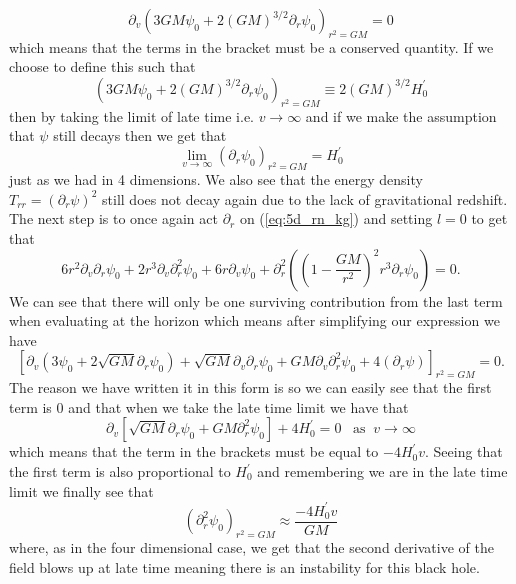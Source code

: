 \documentclass[12pt]{article}
\numberwithin{equation}{section}
\numberwithin{figure}{section}
\begin{document}
\begin{equation}
	\partial_{v}\left(3GM\psi_{0}+2(GM)^{3/2}\partial_{r}\psi_{0}\right)_{r^{2}=GM}=0
\end{equation}
which means that the terms in the bracket must be a conserved quantity. If we choose to define this such that
\begin{equation}
	(3GM\psi_{0}+2(GM)^{3/2}\partial_{r}\psi_{0})_{r^{2}=GM}\equiv 2 (GM)^{3/2}H_{0}^{\prime} 
\end{equation}
then by taking the limit of late time i.e. $v\to \infty$ and if we make the assumption that $\psi$ still decays then we get that
\begin{equation}
	\lim_{v\to\infty}(\partial_{r}\psi_{0})_{r^{2}=GM}=H_{0}^{\prime} 
\end{equation}
just as we had in 4 dimensions. We also see that the energy density $T_{rr}=(\partial_{r}\psi)^{2}$ still does not decay again due to the lack of gravitational redshift. The next step is to once again act $\partial_{r}$ on (\ref{eq:5d_rn_kg}) and setting $l=0$ to get that
\begin{equation}
	6r^{2}\partial_{v}\partial_{r}\psi_{0}+2r^{3}\partial_{v}\partial_{r}^{2}\psi_{0}+6r\partial_{v}\psi_{0}+\partial_{r}^{2}\left(\left(1- \frac{GM}{r^{2}}\right)^{2}r^{3}\partial_{r}\psi_{0}\right)=0.
\end{equation}
We can see that there will only be one surviving contribution from the last term when evaluating at the horizon which means after simplifying our expression we have
\begin{equation}
	\left[\partial_{v}(3\psi_{0}+2\sqrt{GM}\partial_{r}\psi_{0})+\sqrt{GM}\partial_{v}\partial_{r}\psi_{0}+GM\partial_{v}\partial_{r}^{2}\psi_{0}+4(\partial_{r}\psi)\right]_{r^{2}=GM}=0.
\end{equation}
The reason we have written it in this form is so we can easily see that the first term is 0 and that when we take the late time limit we have that
\begin{equation}
	\partial_{v}\left[\sqrt{GM}\partial_{r}\psi_{0}+GM\partial_{r}^{2}\psi_{0}\right]+4H_{0}^{\prime} =0 \;\;\;\text{as}\;\; v\to\infty
\end{equation}
which means that the term in the brackets must be equal to $-4H_{0}^{\prime}v$. Seeing that the first term is also proportional to $H_{0}^{\prime}$ and remembering we are in the late time limit we finally see that
\begin{equation}
	(\partial_{r}^{2}\psi_{0})_{r^{2}=GM}\approx \frac{-4H_{0}^{\prime}v}{GM}
\end{equation}
where, as in the four dimensional case, we get that the second derivative of the field blows up at late time meaning there is an instability for this black hole.
\end{document}
